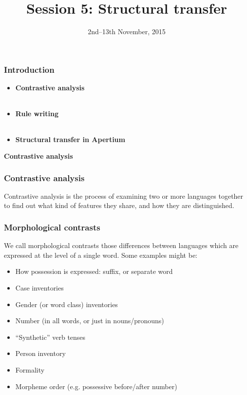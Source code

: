 \documentclass[10pt,xetex]{beamer} %
\date{2nd--13th November, 2015}
\title{Session 5: Structural transfer}
\begin{document}
\begin{frame}
        \titlepage
\MyLogoBottomCentred
\end{frame}



%

\begin{frame}
 \frametitle{Introduction}

\begin{itemize}
  \item {\bf Contrastive analysis}
~\\
~\\
  \item {\bf Rule writing}
~\\
~\\
  \item {\bf Structural transfer in Apertium}
\end{itemize}

\end{frame}

\begin{frame} %
 \begin{center}
 {\Large {\bf Contrastive analysis}} 
 \end{center}
\end{frame}

\begin{frame}
  \frametitle{Contrastive analysis}

Contrastive analysis is the process of examining two or more languages together to find out what kind of features they share, and how they are distinguished. 

\end{frame}

\begin{frame}
  \frametitle{Morphological contrasts}

We call morphological contrasts those differences between languages which are expressed at the level of a single word. Some examples might be:

\begin{itemize}
  \item How possession is expressed: suffix, or separate word
  \item Case inventories
  \item Gender (or word class) inventories
  \item Number (in all words, or just in nouns/pronouns)
  \item ``Synthetic'' verb tenses
  \item Person inventory 
  \item Formality
  \item Morpheme order (e.g. possessive before/after number)
\end{itemize}

\end{frame}
\end{document}
